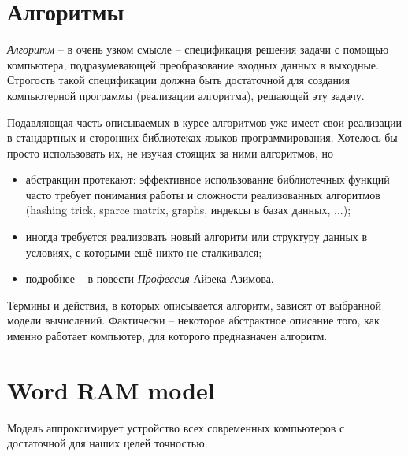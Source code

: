 \documentclass[12pt,a4paper]{report}
\begin{document}

\section{Алгоритмы}

{\em Алгоритм} -- в очень узком смысле -- спецификация решения задачи с помощью компьютера, подразумевающей преобразование входных данных в выходные. Строгость такой спецификации должна быть достаточной для создания компьютерной программы (реализации алгоритма), решающей эту задачу.

Подавляющая часть описываемых в курсе алгоритмов уже имеет свои реализации в стандартных и сторонних библиотеках языков программирования. Хотелось бы просто использовать их, не изучая стоящих за ними алгоритмов, но
\begin{itemize}
  \item абстракции протекают: эффективное использование библиотечных функций часто требует понимания работы и сложности реализованных алгоритмов (hashing trick, sparce matrix, graphs, индексы в базах данных, ...);
  \item иногда требуется реализовать новый алгоритм или структуру данных в условиях, с которыми ещё никто не сталкивался;
  \item подробнее -- в повести {\em Профессия} Айзека Азимова.
\end{itemize}

Термины и действия, в которых описывается алгоритм, зависят от выбранной модели вычислений.
Фактически -- некоторое абстрактное описание того, как именно работает компьютер, для которого предназначен алгоритм.


\section{Word RAM model}

Модель аппроксимирует устройство всех современных компьютеров с достаточной для наших целей точностью.
\end{document}
